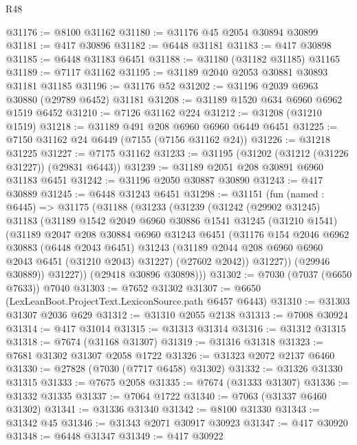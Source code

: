 \begin{lexlean}{R48}
\begin{coremodule}
@31176 := @8100 @31162
@31180 := @31176 @45 @2054 @30894 @30899
@31181 := @417 @30896
@31182 := @6448 @31181
@31183 := @417 @30898
@31185 := @6448 @31183 @6451
@31188 := @31180 (@31182 @31185) @31165
@31189 := @7117 @31162
@31195 := @31189 @2040 @2053 @30881 @30893 @31181 @31185
@31196 := @31176 @52
@31202 := @31196 @2039 @6963 @30880 (@29789 @6452) @31181
@31208 := @31189 @1520 @634 @6960 @6962 @1519 @6452
@31210 := @7126 @31162 @224
@31212 := @31208 (@31210 @1519)
@31218 := @31189 @491 @208 @6960 @6960 @6449 @6451
@31225 := @7150 @31162 @24 @6449 (@7155 (@7156 @31162 @24))
@31226 := @31218 @31225
@31227 := @7175 @31162
@31233 := @31195 (@31202 (@31212 (@31226 @31227)) (@29831 @6443))
@31239 := @31189 @2051 @208 @30891 @6960 @31183 @6451
@31242 := @31196 @2050 @30887 @30890
@31243 := @417 @30889
@31245 := @6448 @31243 @6451
@31298 := @31151
    (fun (named : @6445) =>
    @31175
      (@31188
        (@31233
          (@31239
            (@31242
              (@29902 @31245)
              @31183
              (@31189
                @1542
                @2049
                @6960
                @30886
                @1541
                @31245
                (@31210 @1541)
                (@31189
                  @2047
                  @208
                  @30884
                  @6960
                  @31243
                  @6451
                  (@31176
                    @154
                    @2046
                    @6962
                    @30883
                    (@6448 @2043 @6451)
                    @31243
                    (@31189 @2044 @208 @6960 @6960 @2043 @6451 (@31210 @2043) @31227)
                    (@27602 @2042))
                  @31227))
              (@29946 @30889))
            @31227))
        (@29418 @30896 @30898)))
@31302 := @7030 (@7037 (@6650 @7633)) @7040
@31303 := @7652 @31302
@31307 := @6650 (LexLeanBoot.ProjectText.LexiconSource.path @6457 @6443)
@31310 := @31303 @31307 @2036 @629
@31312 := @31310 @2055 @2138
@31313 := @7008 @30924
@31314 := @417 @31014
@31315 := @31313 @31314
@31316 := @31312 @31315
@31318 := @7674 (@31168 @31307)
@31319 := @31316 @31318
@31323 := @7681 @31302 @31307 @2058 @1722
@31326 := @31323 @2072 @2137 @6460
@31330 := @27828 (@7030 (@7717 @6458) @31302)
@31332 := @31326 @31330 @31315
@31333 := @7675 @2058
@31335 := @7674 (@31333 @31307)
@31336 := @31332 @31335
@31337 := @7064 @1722
@31340 := @7063 (@31337 @6460 @31302)
@31341 := @31336 @31340
@31342 := @8100 @31330
@31343 := @31342 @45
@31346 := @31343 @2071 @30917 @30923
@31347 := @417 @30920
@31348 := @6448 @31347
@31349 := @417 @30922

\end{coremodule}
\end{lexlean}
